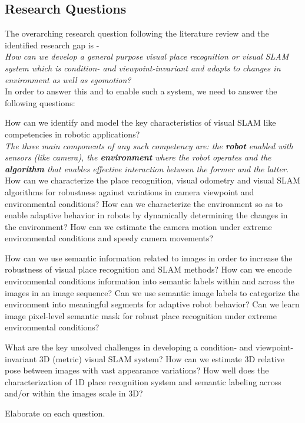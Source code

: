 \documentclass{article}
\begin{document}
\subsection{Research Questions}
The overarching research question following the literature review and the identified research gap is - \\\emph{How can we develop a general purpose visual place recognition or visual SLAM system which is condition- and viewpoint-invariant and adapts to changes in environment as well as egomotion?} 
\\
In order to answer this and to enable such a system, we need to answer the following questions:
\begin{outline}
 \1 How can we identify and model the key characteristics of visual SLAM like competencies in robotic applications?
 \\ \emph{The three main components of any such competency are: the \textbf{robot} enabled with sensors (like camera), the \textbf{environment} where the robot operates and the \textbf{algorithm} that enables effective interaction between the former and the latter.}
 \2 How can we characterize the place recognition, visual odometry and visual SLAM algorithms for robustness against variations in camera viewpoint and environmental conditions?
 \2 How can we characterize the environment so as to enable adaptive behavior in robots by dynamically determining the changes in the environment?
 \2 How can we estimate the camera motion under extreme environmental conditions and speedy camera movements?
 
 \1 How can we use semantic information related to images in order to increase the robustness of visual place recognition and SLAM methods?
 \2 How can we encode environmental conditions information into semantic labels within and across the images in an image sequence?
 \2 Can we use semantic image labels to categorize the environment into meaningful segments for adaptive robot behavior?
 \2 Can we learn image pixel-level semantic mask for robust place recognition under extreme environmental conditions?
 
 \1 What are the key unsolved challenges in developing a condition- and viewpoint-invariant 3D (metric) visual SLAM system?
 \2 How can we estimate 3D relative pose between images with vast appearance variations?
 \2 How well does the characterization of 1D place recognition system and semantic labeling across and/or within the images scale in 3D?
 
 
 \1 Elaborate on each question.
\end{outline}
\end{document}
